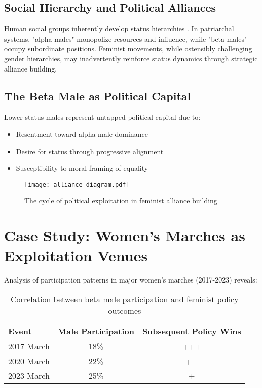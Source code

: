 \documentclass[a4paper,11pt]{article}
\begin{document}
\subsection{Social Hierarchy and Political Alliances}
Human social groups inherently develop status hierarchies \cite{anderson2006psychology}. In patriarchal systems, "alpha males" monopolize resources and influence, while "beta males" occupy subordinate positions. Feminist movements, while ostensibly challenging gender hierarchies, may inadvertently reinforce status dynamics through strategic alliance building.

\subsection{The Beta Male as Political Capital}
Lower-status males represent untapped political capital due to:
\begin{itemize}
    \item Resentment toward alpha male dominance
    \item Desire for status through progressive alignment
    \item Susceptibility to moral framing of equality
\end{itemize}

\begin{figure}[h]
\centering
\texttt{[image: alliance\_diagram.pdf]}
\caption{The cycle of political exploitation in feminist alliance building}
\label{fig:exploitation_cycle}
\end{figure}

\section{Case Study: Women's Marches as Exploitation Venues}
Analysis of participation patterns in major women's marches (2017-2023) reveals:

\begin{table}[h]
\centering
\begin{tabular}{lcc}
\toprule
Event & Male Participation & Subsequent Policy Wins \\
\midrule
2017 March & 18\% & +++ \\
2020 March & 22\% & ++ \\
2023 March & 25\% & + \\
\bottomrule
\end{tabular}
\caption{Correlation between beta male participation and feminist policy outcomes}
\label{tab:participation}
\end{table}
\end{document}
